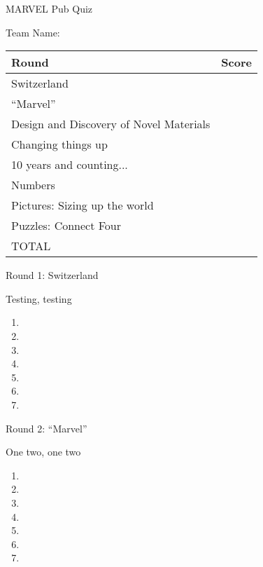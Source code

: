 

\centering
\Huge
MARVEL Pub Quiz
\vspace{2cm}

\LARGE
Team Name: \underline{\hphantom{XXXXXXXXXXXXXXXXXXXXXXXXXX}}

\vspace{3cm}

\LARGE
\begin{tabular}{ll}
\hline
Round & Score \\
\hline
Switzerland & \\
``Marvel'' & \\
Design and Discovery of Novel Materials & \\
Changing things up & \\
10 years and counting... & \\
Numbers & \\
Pictures: Sizing up the world & \\
Puzzles: Connect Four & \\
TOTAL \\
\hline
\end{tabular}
\thispagestyle{empty}
\Huge
\newpage
\begin{center}
\Huge
Round 1: Switzerland
\end{center}
\large
Testing, testing

\Huge
\begin{enumerate}
\item
\item
\item
\item
\item
\item
\item
\end{enumerate}

\newpage
\begin{center}
\Huge
Round 2: ``Marvel''
\end{center}
\large
One two, one two

\Huge
\begin{enumerate}
\item
\item
\item
\item
\item
\item
\item
\end{enumerate}

